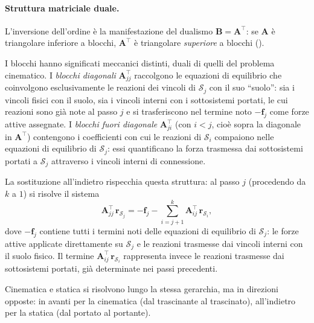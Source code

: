 \paragraph{Struttura matriciale duale.}
L'inversione dell'ordine è la manifestazione del dualismo
$\bm{B} = \bm{A}^{\top}$: se $\bm{A}$ è triangolare
inferiore a blocchi, $\bm{A}^{\top}$ è triangolare
\emph{superiore} a blocchi ().
	
	I blocchi hanno significati meccanici distinti,
	duali di quelli del problema cinematico. I
	\emph{blocchi diagonali} $\bm{A}_{jj}^{\top}$
	raccolgono le equazioni di equilibrio che
	coinvolgono esclusivamente le reazioni dei vincoli
	di $\mathcal{S}_j$ con il suo ``suolo'': sia i
	vincoli fisici con il suolo, sia i vincoli interni
	con i sottosistemi portati, le cui reazioni sono
	già note al passo $j$ e si trasferiscono nel
	termine noto $-\bm{f}_j$ come forze attive
	assegnate. I \emph{blocchi fuori diagonale}
	$\bm{A}_{ji}^{\top}$ (con $i < j$, cioè sopra la
	diagonale in $\bm{A}^\top$) contengono i
	coefficienti con cui le reazioni di $\mathcal{S}_i$
	compaiono nelle equazioni di equilibrio di
	$\mathcal{S}_j$: essi quantificano la forza
	trasmessa dai sottosistemi portati a $\mathcal{S}_j$
	attraverso i vincoli interni di connessione.
	
	La sostituzione all'indietro rispecchia questa
	struttura: al passo $j$ (procedendo da $k$ a $1$)
	si risolve il sistema
	\begin{equation}
		\bm{A}_{jj}^{\top}\,\bm{r}_{\mathcal{S}_j} =
		-\bm{f}_j -
		\sum_{i=j+1}^{k}
		\bm{A}_{ij}^{\top}\,\bm{r}_{\mathcal{S}_i},
	\end{equation}
	dove $-\bm{f}_j$ contiene tutti i termini noti
	delle equazioni di equilibrio di $\mathcal{S}_j$:
	le forze attive applicate direttamente su
	$\mathcal{S}_j$ e le reazioni trasmesse dai
	vincoli interni con il suolo fisico. Il termine
	$\bm{A}_{ij}^{\top}\,\bm{r}_{\mathcal{S}_i}$
	rappresenta invece le reazioni trasmesse dai
	sottosistemi portati, già determinate nei passi
	precedenti.
	
	Cinematica e statica si risolvono lungo la stessa
	gerarchia, ma in direzioni opposte: in avanti per
	la cinematica (dal trascinante al trascinato), 
	all'indietro per la statica (dal portato al
	portante).





